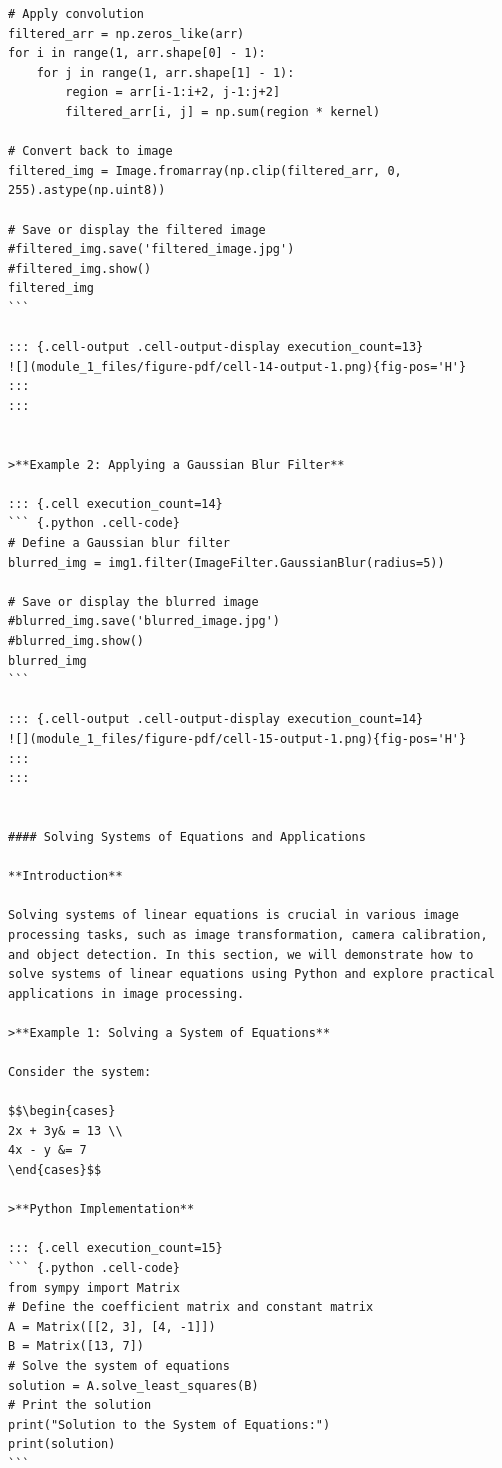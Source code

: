 \documentclass[
  letterpaper,
  DIV=11,
  numbers=noendperiod]{scrreprt}
\theoremstyle{plain}
\theoremstyle{definition}
\theoremstyle{remark}
\begin{document}
\begin{verbatim}
# Apply convolution
filtered_arr = np.zeros_like(arr)
for i in range(1, arr.shape[0] - 1):
    for j in range(1, arr.shape[1] - 1):
        region = arr[i-1:i+2, j-1:j+2]
        filtered_arr[i, j] = np.sum(region * kernel)

# Convert back to image
filtered_img = Image.fromarray(np.clip(filtered_arr, 0, 255).astype(np.uint8))

# Save or display the filtered image
#filtered_img.save('filtered_image.jpg')
#filtered_img.show()
filtered_img
```

::: {.cell-output .cell-output-display execution_count=13}
![](module_1_files/figure-pdf/cell-14-output-1.png){fig-pos='H'}
:::
:::


>**Example 2: Applying a Gaussian Blur Filter**

::: {.cell execution_count=14}
``` {.python .cell-code}
# Define a Gaussian blur filter
blurred_img = img1.filter(ImageFilter.GaussianBlur(radius=5))

# Save or display the blurred image
#blurred_img.save('blurred_image.jpg')
#blurred_img.show()
blurred_img
```

::: {.cell-output .cell-output-display execution_count=14}
![](module_1_files/figure-pdf/cell-15-output-1.png){fig-pos='H'}
:::
:::


#### Solving Systems of Equations and Applications

**Introduction**

Solving systems of linear equations is crucial in various image processing tasks, such as image transformation, camera calibration, and object detection. In this section, we will demonstrate how to solve systems of linear equations using Python and explore practical applications in image processing.

>**Example 1: Solving a System of Equations**

Consider the system:

$$\begin{cases}
2x + 3y& = 13 \\
4x - y &= 7
\end{cases}$$

>**Python Implementation**

::: {.cell execution_count=15}
``` {.python .cell-code}
from sympy import Matrix
# Define the coefficient matrix and constant matrix
A = Matrix([[2, 3], [4, -1]])
B = Matrix([13, 7])
# Solve the system of equations
solution = A.solve_least_squares(B)
# Print the solution
print("Solution to the System of Equations:")
print(solution)
```


\end{verbatim}
\end{document}
